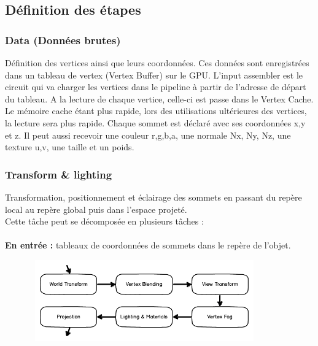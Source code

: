 \subsection{Définition des étapes}
\subsubsection{Data (Données brutes)}
Définition des vertices ainsi que leurs coordonnées. Ces données sont enregistrées dans un tableau de vertex (Vertex Buffer) sur le GPU. L’input assembler est le circuit qui va charger les vertices dans le pipeline à partir de l’adresse de départ du tableau. A la lecture de chaque vertice, celle-ci est passe dans le Vertex Cache. Le mémoire cache étant plus rapide, lors des utilisations ultérieures des vertices, la lecture sera plus rapide.
Chaque sommet est déclaré avec ses coordonnées x,y et z. Il peut aussi recevoir une couleur r,g,b,a, une normale Nx, Ny, Nz, une texture u,v, une taille et un poids.
\subsubsection{Transform \& lighting}
Transformation, positionnement et éclairage des sommets en passant du repère local au repère global puis dans l’espace projeté.
\\
Cette tâche peut se décomposée en plusieurs tâches :
\\\\
\textbf{En entrée :} tableaux de coordonnées de sommets dans le repère de l’objet.
\\
\begin{center}
\includegraphics[width=12cm,height=35mm]{leo/images/T&L.png}
\end{center}

